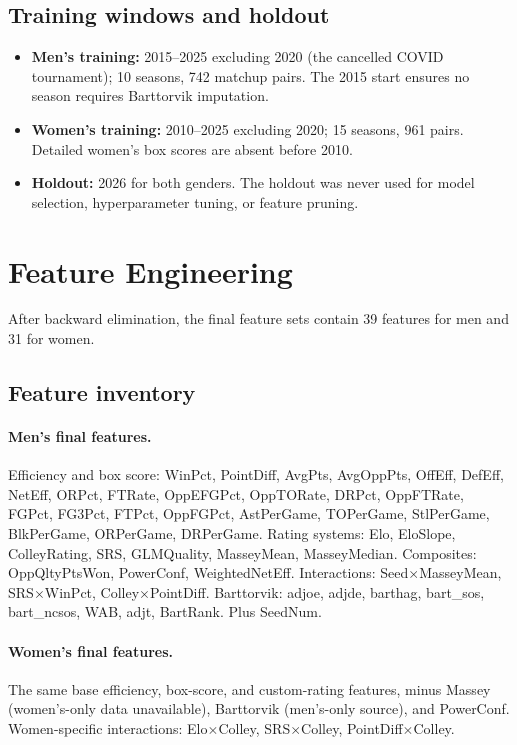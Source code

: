 \documentclass[11pt, a4paper]{article}
\begin{document}
\subsection{Training windows and holdout}
\begin{itemize}[leftmargin=*]
    \item \textbf{Men's training:} 2015--2025 excluding 2020 (the cancelled COVID tournament); 10 seasons, 742 matchup pairs. The 2015 start ensures no season requires Barttorvik imputation.
    \item \textbf{Women's training:} 2010--2025 excluding 2020; 15 seasons, 961 pairs. Detailed women's box scores are absent before 2010.
    \item \textbf{Holdout:} 2026 for both genders. The holdout was never used for model selection, hyperparameter tuning, or feature pruning.
\end{itemize}

\section{Feature Engineering}
\label{sec:features}

After backward elimination, the final feature sets contain 39 features for men and 31 for women.

\subsection{Feature inventory}

\paragraph{Men's final features.} Efficiency and box score: WinPct, PointDiff, AvgPts, AvgOppPts, OffEff, DefEff, NetEff, ORPct, FTRate, OppEFGPct, OppTORate, DRPct, OppFTRate, FGPct, FG3Pct, FTPct, OppFGPct, AstPerGame, TOPerGame, StlPerGame, BlkPerGame, ORPerGame, DRPerGame. Rating systems: Elo, EloSlope, ColleyRating, SRS, GLMQuality, MasseyMean, MasseyMedian. Composites: OppQltyPtsWon, PowerConf, WeightedNetEff. Interactions: Seed$\times$MasseyMean, SRS$\times$WinPct, Colley$\times$PointDiff. Barttorvik: adjoe, adjde, barthag, bart\_sos, bart\_ncsos, WAB, adjt, BartRank. Plus SeedNum.

\paragraph{Women's final features.} The same base efficiency, box-score, and custom-rating features, minus Massey (women's-only data unavailable), Barttorvik (men's-only source), and PowerConf. Women-specific interactions: Elo$\times$Colley, SRS$\times$Colley, PointDiff$\times$Colley.
\end{document}
